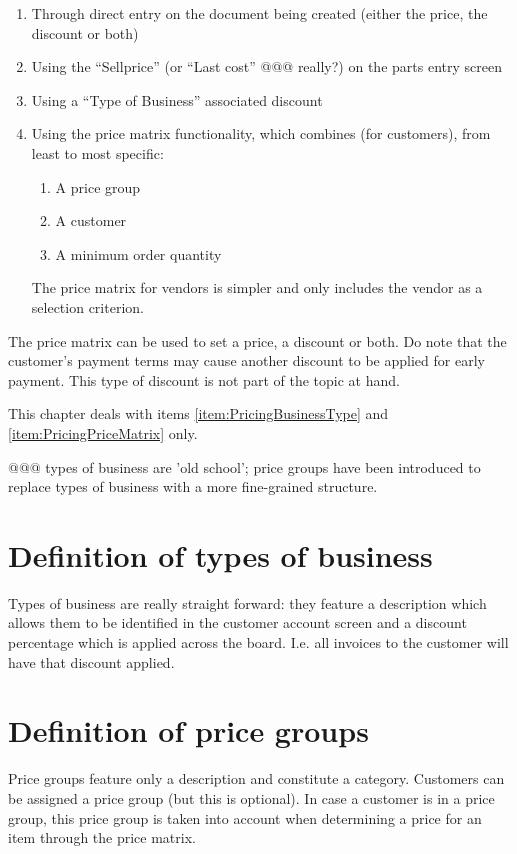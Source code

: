 \begin{enumerate}
	\item Through direct entry on the document being created (either the price, the discount or both)
	\item Using the ``Sellprice'' (or ``Last cost'' @@@ really?) on the parts entry screen
	\item Using a ``Type of Business'' associated discount
	\item Using the price matrix functionality, which combines (for customers), from least to most specific:
		\begin{enumerate}
			\item A price group
			\item A customer
			\item A minimum order quantity
		\end{enumerate}
		The price matrix for vendors is simpler and only includes the vendor as a selection criterion.
\end{enumerate}

The price matrix can be used to set a price, a discount or both.  Do note that the \gls{customer}'s payment
terms may cause another discount to be applied for early payment.  This type of discount is not part of the
topic at hand. 

This chapter deals with items \ref{item:PricingBusinessType} and \ref{item:PricingPriceMatrix} only.

@@@ types of business are 'old school'; price groups have been introduced to replace types of business with a more fine-grained structure.

\section{Definition of types of business}
\label{sec-pricing-business-types}

Types of business are really straight forward: they feature a description
which allows them to be identified in the \gls{customer} account screen and a discount
percentage which is applied across the board. I.e. all invoices to the customer
will have that discount applied.

\section{Definition of price groups}
\label{sec-pricing-price-groups}

Price groups feature only a description and constitute a category. Customers can be assigned a price group
(but this is optional). In case a customer is in a price group, this price group is taken into account when
determining a price for an item through the price matrix.

